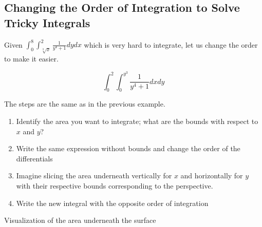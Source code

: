 \subsection{Changing the Order of Integration to Solve Tricky Integrals}

Given \(\int_{0}^{8}\int_{\sqrt[3]{x}}^{2} \frac{1}{y^4 +1}dy dx\) which is very hard to integrate, 
let us change the order to make it easier.

\[
    \int_{0}^{2}\int_{0}^{y^3} \frac{1}{y^4 +1}dx dy
\]

The steps are the same as in the previous example.

\begin{enumerate}

    \item Identify the area you want to integrate; what are the bounds with respect to \(x\) and \(y\)?

    \item Write the same expression without bounds and change the order of the differentials

    \item Imagine slicing the area underneath vertically for \(x\) and horizontally for \(y\) with their 
          respective bounds corresponding to the perspective.

    \item Write the new integral with the opposite order of integration

\end{enumerate}

\begin{center}

    Visualization of the area underneath the surface
    \smallskip

\end{center}

